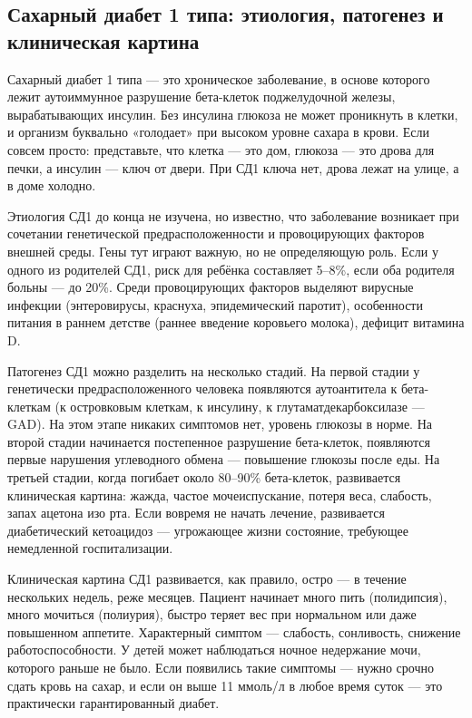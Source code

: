 \documentclass[14pt, a4paper]{extarticle}
\begin{document}
\subsection{Сахарный диабет 1 типа: этиология, патогенез и клиническая картина}

\noindent Сахарный диабет 1 типа — это хроническое заболевание, в основе которого лежит аутоиммунное разрушение бета-клеток поджелудочной железы, вырабатывающих инсулин. Без инсулина глюкоза не может проникнуть в клетки, и организм буквально «голодает» при высоком уровне сахара в крови. Если совсем просто: представьте, что клетка — это дом, глюкоза — это дрова для печки, а инсулин — ключ от двери. При СД1 ключа нет, дрова лежат на улице, а в доме холодно.

\medskip
\noindent Этиология СД1 до конца не изучена, но известно, что заболевание возникает при сочетании генетической предрасположенности и провоцирующих факторов внешней среды. Гены тут играют важную, но не определяющую роль. Если у одного из родителей СД1, риск для ребёнка составляет 5–8\%, если оба родителя больны — до 20\%. Среди провоцирующих факторов выделяют вирусные инфекции (энтеровирусы, краснуха, эпидемический паротит), особенности питания в раннем детстве (раннее введение коровьего молока), дефицит витамина D.

\medskip
\noindent Патогенез СД1 можно разделить на несколько стадий. На первой стадии у генетически предрасположенного человека появляются аутоантитела к бета-клеткам (к островковым клеткам, к инсулину, к глутаматдекарбоксилазе — GAD). На этом этапе никаких симптомов нет, уровень глюкозы в норме. На второй стадии начинается постепенное разрушение бета-клеток, появляются первые нарушения углеводного обмена — повышение глюкозы после еды. На третьей стадии, когда погибает около 80–90\% бета-клеток, развивается клиническая картина: жажда, частое мочеиспускание, потеря веса, слабость, запах ацетона изо рта. Если вовремя не начать лечение, развивается диабетический кетоацидоз — угрожающее жизни состояние, требующее немедленной госпитализации.

\vskip  1cm
\noindent Клиническая картина СД1 развивается, как правило, остро — в течение нескольких недель, реже месяцев. Пациент начинает много пить (полидипсия), много мочиться (полиурия), быстро теряет вес при нормальном или даже повышенном аппетите. Характерный симптом — слабость, сонливость, снижение работоспособности. У детей может наблюдаться ночное недержание мочи, которого раньше не было. Если появились такие симптомы — нужно срочно сдать кровь на сахар, и если он выше 11 ммоль/л в любое время суток — это практически гарантированный диабет.
\end{document}
